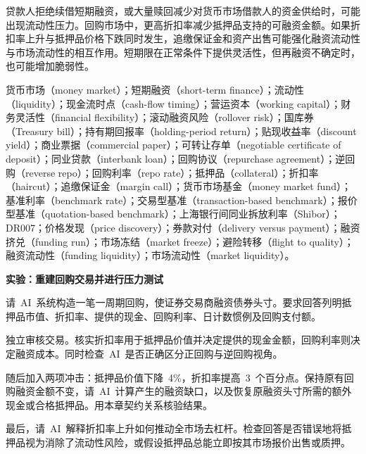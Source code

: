 贷款人拒绝续借短期融资，或大量赎回减少对货币市场借款人的资金供给时，可能出现流动性压力。回购市场中，更高折扣率减少抵押品支持的可融资金额。如果折扣率上升与抵押品价格下跌同时发生，追缴保证金和资产出售可能强化融资流动性与市场流动性的相互作用。短期限在正常条件下提供灵活性，但再融资不确定时，也可能增加脆弱性。



货币市场（money market）；短期融资（short-term finance）；流动性（liquidity）；现金流时点（cash-flow timing）；营运资本（working capital）；财务灵活性（financial flexibility）；滚动融资风险（rollover risk）；国库券（Treasury bill）；持有期回报率（holding-period return）；贴现收益率（discount yield）；商业票据（commercial paper）；可转让存单（negotiable certificate of deposit）；同业贷款（interbank loan）；回购协议（repurchase agreement）；逆回购（reverse repo）；回购利率（repo rate）；抵押品（collateral）；折扣率（haircut）；追缴保证金（margin call）；货币市场基金（money market fund）；基准利率（benchmark rate）；交易型基准（transaction-based benchmark）；报价型基准（quotation-based benchmark）；上海银行间同业拆放利率（Shibor）；DR007；价格发现（price discovery）；券款对付（delivery versus payment）；融资挤兑（funding run）；市场冻结（market freeze）；避险转移（flight to quality）；融资流动性（funding liquidity）；市场流动性（market liquidity）。



\textbf{实验：重建回购交易并进行压力测试}

请~AI~系统构造一笔一周期回购，使证券交易商融资债券头寸。要求回答列明抵押品市值、折扣率、提供的现金、回购利率、日计数惯例及回购支付额。

独立审核交易。核实折扣率用于抵押品价值并决定提供的现金金额，回购利率则决定融资成本。同时检查~AI~是否正确区分正回购与逆回购视角。

随后加入两项冲击：抵押品价值下降~4\%，折扣率提高~3~个百分点。保持原有回购融资金额不变，请~AI~计算产生的融资缺口，以及恢复原融资头寸所需的额外现金或合格抵押品。用本章契约关系核验结果。

最后，请~AI~解释折扣率上升如何推动全市场去杠杆。检查回答是否错误地将抵押品视为消除了流动性风险，或假设抵押品总能立即按其市场报价出售或质押。

